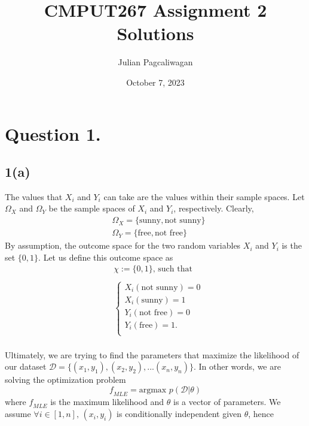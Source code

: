\documentclass{report}
\title{CMPUT267 Assignment 2 Solutions}
\author{Julian Pagcaliwagan}
\date{October 7, 2023}
\theoremstyle{definition}
\begin{document}
\maketitle
\section*{Question 1.}
\subsection*{1(a)}
The values that $X_i$ and $Y_i$ can take are the values within their sample spaces. 
Let $\Omega_X$ and $\Omega_Y$ be the sample spaces of $X_i$ and $Y_i$, respectively. Clearly,
\begin{equation*}
    \begin{aligned}
        &\Omega_X = \{\text{sunny}, \text{not sunny}\}\\
        &\Omega_Y = \{\text{free}, \text{not free}\}
    \end{aligned}
\end{equation*}
By assumption, the outcome space for the two random variables
$ X_i $ and $Y_i$ is the set $\{0, 1\}$. Let us define this outcome space as
\begin{equation*}
    \begin{aligned}
        &\chi := \{0, 1\}\text{, such that}\\\\
        &\begin{cases}
            X_i(\text{not sunny}) = 0 \\
            X_i(\text{sunny}) = 1 \\
            Y_i(\text{not free}) = 0\\
            Y_i(\text{free}) = 1.\\
        \end{cases}
    \end{aligned}
\end{equation*}
\\
Ultimately, we are trying to find the parameters that maximize the likelihood of our dataset $\mathcal{D} = \{(x_1, y_1), (x_2, y_2), ... (x_n, y_n)\}$.
In other words, we are solving the optimization problem
\begin{equation*}
    \mathit{f}_{MLE} = \text{argmax }p(\mathcal{D}|\theta)
\end{equation*} 
where $\mathit{f}_{MLE}$ is the maximum likelihood and $\theta$ is a vector of parameters. We assume $\forall i \in [1, n]
\text{, } (x_i, y_i)$ is conditionally independent given $\theta$, hence
\end{document}
